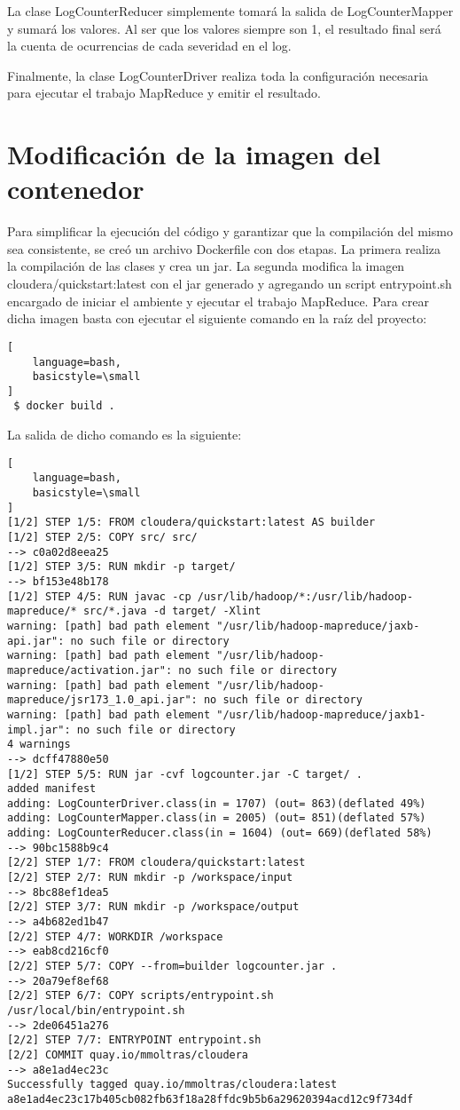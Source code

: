 \documentclass[a4paper]{article}
\begin{document}
La clase LogCounterReducer simplemente tomará la salida de LogCounterMapper y
sumará los valores. Al ser que los valores siempre son 1, el resultado final
será la cuenta de ocurrencias de cada severidad en el log.

Finalmente, la clase LogCounterDriver realiza toda la configuración necesaria
para ejecutar el trabajo MapReduce y emitir el resultado.

\section{Modificación de la imagen del contenedor}

Para simplificar la ejecución del código y garantizar que la compilación del
mismo sea consistente, se creó un archivo Dockerfile con dos etapas. La primera
realiza la compilación de las clases y crea un jar. La segunda modifica la
imagen cloudera/quickstart:latest con el jar generado y agregando
un script entrypoint.sh encargado de iniciar el ambiente y ejecutar el trabajo
MapReduce. Para crear dicha imagen basta con ejecutar el siguiente comando en
la raíz del proyecto:

\begin{lstlisting}[
    language=bash,
    basicstyle=\small
]
 $ docker build .
\end{lstlisting}

La salida de dicho comando es la siguiente:

\begin{lstlisting}[
    language=bash,
    basicstyle=\small
]
[1/2] STEP 1/5: FROM cloudera/quickstart:latest AS builder
[1/2] STEP 2/5: COPY src/ src/
--> c0a02d8eea25
[1/2] STEP 3/5: RUN mkdir -p target/
--> bf153e48b178
[1/2] STEP 4/5: RUN javac -cp /usr/lib/hadoop/*:/usr/lib/hadoop-mapreduce/* src/*.java -d target/ -Xlint
warning: [path] bad path element "/usr/lib/hadoop-mapreduce/jaxb-api.jar": no such file or directory
warning: [path] bad path element "/usr/lib/hadoop-mapreduce/activation.jar": no such file or directory
warning: [path] bad path element "/usr/lib/hadoop-mapreduce/jsr173_1.0_api.jar": no such file or directory
warning: [path] bad path element "/usr/lib/hadoop-mapreduce/jaxb1-impl.jar": no such file or directory
4 warnings
--> dcff47880e50
[1/2] STEP 5/5: RUN jar -cvf logcounter.jar -C target/ .
added manifest
adding: LogCounterDriver.class(in = 1707) (out= 863)(deflated 49%)
adding: LogCounterMapper.class(in = 2005) (out= 851)(deflated 57%)
adding: LogCounterReducer.class(in = 1604) (out= 669)(deflated 58%)
--> 90bc1588b9c4
[2/2] STEP 1/7: FROM cloudera/quickstart:latest
[2/2] STEP 2/7: RUN mkdir -p /workspace/input
--> 8bc88ef1dea5
[2/2] STEP 3/7: RUN mkdir -p /workspace/output
--> a4b682ed1b47
[2/2] STEP 4/7: WORKDIR /workspace
--> eab8cd216cf0
[2/2] STEP 5/7: COPY --from=builder logcounter.jar .
--> 20a79ef8ef68
[2/2] STEP 6/7: COPY scripts/entrypoint.sh /usr/local/bin/entrypoint.sh
--> 2de06451a276
[2/2] STEP 7/7: ENTRYPOINT entrypoint.sh
[2/2] COMMIT quay.io/mmoltras/cloudera
--> a8e1ad4ec23c
Successfully tagged quay.io/mmoltras/cloudera:latest
a8e1ad4ec23c17b405cb082fb63f18a28ffdc9b5b6a29620394acd12c9f734df
\end{lstlisting}
\end{document}
